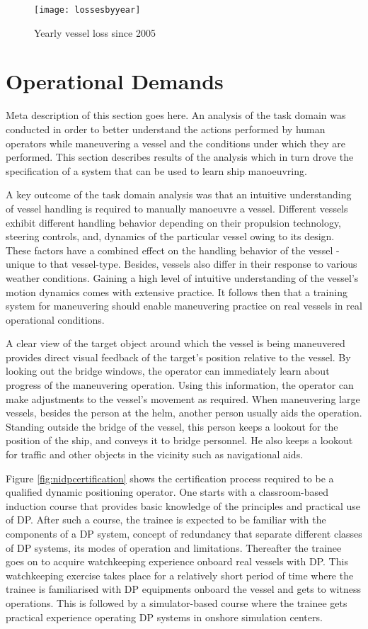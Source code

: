 \begin{figure}
	\centering
	\texttt{[image: lossesbyyear]}
	\caption{Yearly vessel loss since 2005}
	\label{fig:lossesbyyear}
\end{figure}

\section{Operational Demands}
\label{sec:operationaldemands}
Meta description of this section goes here. An analysis of the task domain was conducted in order to better understand the actions performed by human operators while maneuvering a vessel and the conditions under which they are performed. This section describes results of the analysis which in turn drove the specification of a system that can be used to learn ship manoeuvring.

A key outcome of the task domain analysis was that an intuitive understanding of vessel handling is required to manually manoeuvre a vessel. Different vessels exhibit different handling behavior depending on their propulsion technology, steering controls, and, dynamics of the particular vessel owing to its design. These factors have a combined effect on the handling behavior of the vessel - unique to that vessel-type. Besides, vessels also differ in their response to various weather conditions. Gaining a high level of intuitive understanding of the vessel’s motion dynamics comes with extensive practice. It follows then that a training system for maneuvering should enable maneuvering practice on real vessels in real operational conditions.

A clear view of the target object around which the vessel is being maneuvered provides direct visual feedback of the target’s position relative to the vessel. By looking out the bridge windows, the operator can immediately learn about progress of the maneuvering operation. Using this information, the operator can make adjustments to the vessel's movement as required. When maneuvering large vessels, besides the person at the helm, another person usually aids the operation. Standing outside the bridge of the vessel, this person keeps a lookout for the position of the ship, and conveys it to bridge personnel. He also keeps a lookout for traffic and other objects in the vicinity such as navigational aids.

Figure \ref{fig:nidpcertification} shows the certification process required to be a qualified dynamic positioning operator. One starts with a classroom-based induction course that provides basic knowledge of the principles and practical use of DP. After such a course, the trainee is expected to be familiar with the components of a DP system, concept of redundancy that separate different classes of DP systems, its modes of operation and limitations. Thereafter the trainee goes on to acquire watchkeeping experience onboard real vessels with DP. This watchkeeping exercise takes place for a relatively short period of time where the trainee is familiarised with DP equipments onboard the vessel and gets to witness operations. This is followed by a simulator-based course where the trainee gets practical experience operating DP systems in onshore simulation centers. 

